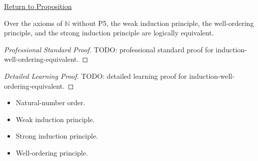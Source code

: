 \newpage
{}
\label{prf:induction-well-ordering-equivalent}

\begin{remark*}[Return]
\hyperref[prop:induction-well-ordering-equivalent]{Return to Proposition}
\end{remark*}

\begin{proposition*}
Over the axioms of $\mathbb{N}$ without P5, the weak induction principle,
the well-ordering principle, and the strong induction principle are
logically equivalent.
\end{proposition*}

\begin{proof}[Professional Standard Proof]
\LRAProofBodyStart
TODO: professional standard proof for induction-well-ordering-equivalent.
\end{proof}

\begin{proof}[Detailed Learning Proof]
\LRAProofBodyStart
TODO: detailed learning proof for induction-well-ordering-equivalent.
\end{proof}

\begin{remark*}

\end{remark*}

\begin{dependencies}
\begin{itemize}
  \item Natural-number order.
  \item Weak induction principle.
  \item Strong induction principle.
  \item Well-ordering principle.
\end{itemize}
\end{dependencies}

\clearpage
